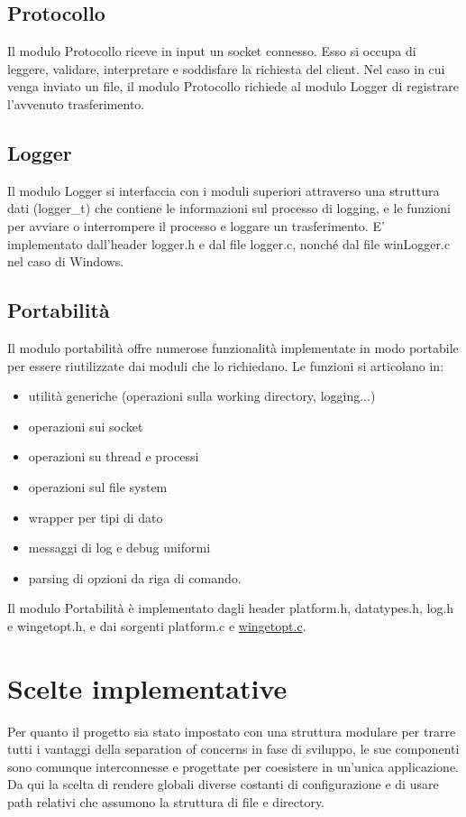\documentclass{article}
\begin{document}
\subsection{Protocollo}
Il modulo Protocollo riceve in input un socket connesso.
Esso si occupa di leggere, validare, interpretare e soddisfare la richiesta del client.
Nel caso in cui venga inviato un file, il modulo Protocollo richiede al modulo Logger di registrare 
l'avvenuto trasferimento.

\subsection{Logger}
Il modulo Logger si interfaccia con i moduli superiori attraverso una struttura dati (logger\_t) che
contiene le informazioni sul processo di logging, e le funzioni per avviare o interrompere il processo
e loggare un trasferimento.
E' implementato dall'header logger.h e dal file logger.c, nonché dal file winLogger.c nel caso di Windows. 


\subsection{Portabilità}
Il modulo portabilità offre numerose funzionalità implementate in modo portabile per essere riutilizzate
dai moduli che lo richiedano. Le funzioni si articolano in:
\begin{itemize}
    \item utilità generiche (operazioni sulla working directory, logging...)
    \item operazioni sui socket
    \item operazioni su thread e processi
    \item operazioni sul file system
    \item wrapper per tipi di dato
    \item messaggi di log e debug uniformi
    \item parsing di opzioni da riga di comando.
\end{itemize}
Il modulo Portabilità è implementato dagli header platform.h, datatypes.h, log.h e wingetopt.h, e dai 
sorgenti platform.c e \href{http://note.sonots.com/Comp/CompLang/cpp/getopt.html}{wingetopt.c}. 
\newpage


\section{Scelte implementative}

Per quanto il progetto sia stato impostato con una struttura modulare per trarre tutti i vantaggi della
separation of concerns in fase di sviluppo, le sue componenti sono comunque interconnesse e progettate per coesistere 
in un'unica applicazione. Da qui la scelta di rendere globali diverse costanti di configurazione 
e di usare path relativi che assumono la struttura di file e directory.\\
\end{document}
